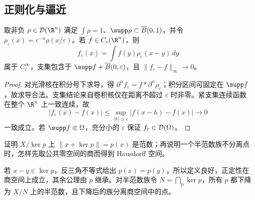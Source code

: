 \subsection{正则化与逼近}
\begin{proposition}[紧支集连续函数的光滑逼近]\label{prop:y1-mollify}
取非负 $\rho\in\Test(\R^n)$ 满足 $\int\rho=1$、$\supp\rho\subset\overline B(0,1)$，并令 $\rho_\varepsilon(x)=\varepsilon^{-n}\rho(x/\varepsilon)$。若 $f\in C_c(\R^n)$，则
\[
 f_\varepsilon(x)=\int f(y)\rho_\varepsilon(x-y)\,dy
\]
属于 $C_c^\infty$，支集包含于 $\supp f+\overline B(0,\varepsilon)$，且 $\|f_\varepsilon-f\|_\infty\to0$。
\end{proposition}
\begin{proof}
对光滑核在积分号下求导，得 $\partial^\alpha f_\varepsilon=f*\partial^\alpha\rho_\varepsilon$；积分区间可固定在 $\supp f$，故求导合法。支集结论来自卷积核仅在距离不超过 $\varepsilon$ 时非零。紧支集连续函数在整个 $\R^n$ 上一致连续，故
\[
 |f_\varepsilon(x)-f(x)|\le
 \sup_{|h|\le\varepsilon}|f(x-h)-f(x)|\longrightarrow0
\]
一致成立。若 $\supp f\Subset\Omega$，充分小的 $\varepsilon$ 保证 $f_\varepsilon\in\mathcal{D}(\Omega)$。
\end{proof}

\begin{exercise}[补充：半范数的零空间]
证明 $X/\ker p$ 上 $\|x+\ker p\|=p(x)$ 是范数；再说明一个半范数族不分离点时，怎样先取公共零空间的商而得到 Hausdorff 空间。
\end{exercise}
\begin{solution}
若 $x-y\in\ker p$，反三角不等式给出 $p(x)=p(y)$，所以定义良好，正定性在商空间上成立，其余公理由 $p$ 继承。对半范数族令 $N=\bigcap_p\ker p$，所有 $p$ 都下降为 $X/N$ 上的半范数，且下降后的族分离商空间中的点。
\end{solution}

